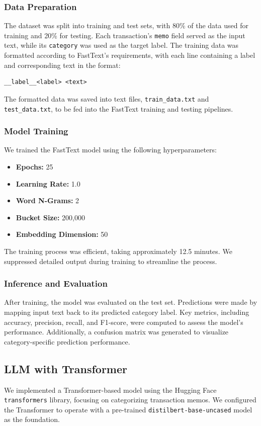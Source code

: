 \documentclass[12pt,letterpaper]{article}
\begin{document}
\subsubsection{Data Preparation}
The dataset was split into training and test sets, with 80\% of the data used for training and 20\% for testing. Each transaction's \texttt{memo} field served as the input text, while its \texttt{category} was used as the target label. The training data was formatted according to FastText's requirements, with each line containing a label and corresponding text in the format:

\begin{verbatim}
__label__<label> <text>
\end{verbatim}

The formatted data was saved into text files, \texttt{train\_data.txt} and \texttt{test\_data.txt}, to be fed into the FastText training and testing pipelines.

\subsubsection{Model Training}
We trained the FastText model using the following hyperparameters:
\begin{itemize}
    \item \textbf{Epochs:} 25
    \item \textbf{Learning Rate:} 1.0
    \item \textbf{Word N-Grams:} 2
    \item \textbf{Bucket Size:} 200,000
    \item \textbf{Embedding Dimension:} 50
\end{itemize}

The training process was efficient, taking approximately 12.5 minutes. We suppressed detailed output during training to streamline the process.

\subsubsection{Inference and Evaluation}
After training, the model was evaluated on the test set. Predictions were made by mapping input text back to its predicted category label. Key metrics, including accuracy, precision, recall, and F1-score, were computed to assess the model's performance. Additionally, a confusion matrix was generated to visualize category-specific prediction performance.

\subsection{LLM with Transformer}
We implemented a Transformer-based model using the Hugging Face \texttt{transformers} library, focusing on categorizing transaction memos. We configured the Transformer to operate with a pre-trained \texttt{distilbert-base-uncased} model as the foundation.
\end{document}
